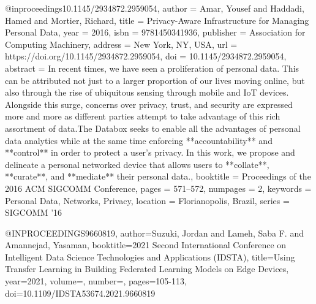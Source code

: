@inproceedings{10.1145/2934872.2959054,
author = {Amar, Yousef and Haddadi, Hamed and Mortier, Richard},
title = {Privacy-Aware Infrastructure for Managing Personal Data},
year = {2016},
isbn = {9781450341936},
publisher = {Association for Computing Machinery},
address = {New York, NY, USA},
url = {https://doi.org/10.1145/2934872.2959054},
doi = {10.1145/2934872.2959054},
abstract = {In recent times, we have seen a proliferation of personal data. This can be attributed not just to a larger proportion of our lives moving online, but also through the rise of ubiquitous sensing through mobile and IoT devices. Alongside this surge, concerns over privacy, trust, and security are expressed more and more as different parties attempt to take advantage of this rich assortment of data.The Databox seeks to enable all the advantages of personal data analytics while at the same time enforcing **accountability** and **control** in order to protect a user's privacy. In this work, we propose and delineate a personal networked device that allows users to **collate**, **curate**, and **mediate** their personal data.},
booktitle = {Proceedings of the 2016 ACM SIGCOMM Conference},
pages = {571–572},
numpages = {2},
keywords = {Personal Data, Networks, Privacy},
location = {Florianopolis, Brazil},
series = {SIGCOMM '16}
}

@INPROCEEDINGS{9660819,  author={Suzuki, Jordan and Lameh, Saba F. and Amannejad, Yasaman},  booktitle={2021 Second International Conference on Intelligent Data Science Technologies and Applications (IDSTA)},   title={Using Transfer Learning in Building Federated Learning Models on Edge Devices},   year={2021},  volume={},  number={},  pages={105-113},  doi={10.1109/IDSTA53674.2021.9660819}}

